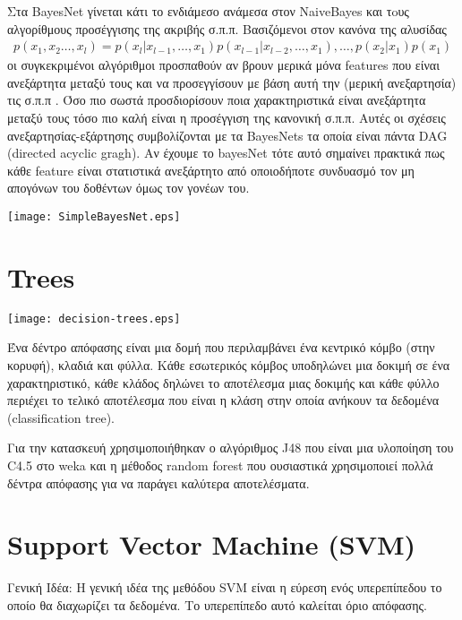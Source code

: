 Στα BayesΝet γίνεται κάτι το ενδιάμεσο ανάμεσα στον NaiveBayes και τoυς αλγορίθμους προσέγγισης της ακριβής σ.π.π.
Βασιζόμενοι στον κανόνα της αλυσίδας
\begin{align*}
p(x_1,x_2 \ldots ,x_l) = p(x_l|x_{l-1},\ldots,x_1)p(x_{l-1}|x_{l-2},\ldots,x_1),\ldots,p(x_2|x_1)p(x_1)
\end{align*}
οι συγκεκριμένοι αλγόριθμοι προσπαθούν αν βρουν μερικά μόνα features που είναι ανεξάρτητα μεταξύ τους και να προσεγγίσουν με βάση αυτή την (μερική ανεξαρτησία) τις σ.π.π .
Όσο πιο σωστά προσδιορίσουν ποια χαρακτηριστικά είναι ανεξάρτητα μεταξύ τους τόσο πιο καλή είναι η προσέγγιση της κανονική σ.π.π.
Αυτές οι σχέσεις ανεξαρτησίας-εξάρτησης συμβολίζονται με τα BayesNets τα οποία είναι πάντα DAG (directed acyclic gragh).
Αν έχουμε το bayesNet τότε αυτό σημαίνει πρακτικά πως κάθε feature  είναι στατιστικά ανεξάρτητο από οποιοδήποτε συνδυασμό τον μη απογόνων του δοθέντων όμως τον γονέων του.

\begin{center}
    \texttt{[image: SimpleBayesNet.eps]}
    \label{fig:BayesNet}
\end{center}

\section{Trees}
\begin{center}
    \texttt{[image: decision-trees.eps]}
    \label{fig:decision-tree}
\end{center}

Ένα δέντρο απόφασης είναι μια δομή που περιλαμβάνει ένα κεντρικό κόμβο (στην κορυφή), κλαδιά και φύλλα.
Κάθε εσωτερικός κόμβος υποδηλώνει μια δοκιμή σε ένα χαρακτηριστικό,
κάθε κλάδος δηλώνει το αποτέλεσμα μιας δοκιμής
και κάθε φύλλο περιέχει το τελικό αποτέλεσμα που είναι η κλάση στην οποία ανήκουν τα δεδομένα (classification tree).

Για την κατασκευή χρησιμοποιήθηκαν ο αλγόριθμος J48 που είναι μια υλοποίηση του C4.5 στο weka
και η μέθοδος random forest που ουσιαστικά χρησιμοποιεί πολλά δέντρα απόφασης για να παράγει καλύτερα αποτελέσματα.



\section{Support Vector Machine (SVM)}
Γενική Ιδέα:
H γενική ιδέα της μεθόδου SVM είναι η εύρεση ενός υπερεπίπεδου το οποίο θα διαχωρίζει τα δεδομένα.
Το υπερεπίπεδο αυτό καλείται όριο απόφασης.

